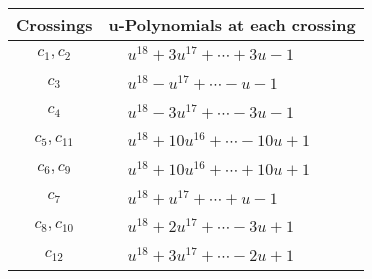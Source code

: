 \documentclass[1p]{elsarticle_modified}
\theoremstyle{definition}
\begin{document}
\begin{tabular}{m{50pt}|m{274pt}}
Crossings & \hspace{64pt}u-Polynomials at each crossing \\
\hline $$\begin{aligned}c_{1},c_{2}\end{aligned}$$&$\begin{aligned}
&u^{18}+3 u^{17}+\cdots+3 u-1
\end{aligned}$\\
\hline $$\begin{aligned}c_{3}\end{aligned}$$&$\begin{aligned}
&u^{18}- u^{17}+\cdots- u-1
\end{aligned}$\\
\hline $$\begin{aligned}c_{4}\end{aligned}$$&$\begin{aligned}
&u^{18}-3 u^{17}+\cdots-3 u-1
\end{aligned}$\\
\hline $$\begin{aligned}c_{5},c_{11}\end{aligned}$$&$\begin{aligned}
&u^{18}+10 u^{16}+\cdots-10 u+1
\end{aligned}$\\
\hline $$\begin{aligned}c_{6},c_{9}\end{aligned}$$&$\begin{aligned}
&u^{18}+10 u^{16}+\cdots+10 u+1
\end{aligned}$\\
\hline $$\begin{aligned}c_{7}\end{aligned}$$&$\begin{aligned}
&u^{18}+u^{17}+\cdots+u-1
\end{aligned}$\\
\hline $$\begin{aligned}c_{8},c_{10}\end{aligned}$$&$\begin{aligned}
&u^{18}+2 u^{17}+\cdots-3 u+1
\end{aligned}$\\
\hline $$\begin{aligned}c_{12}\end{aligned}$$&$\begin{aligned}
&u^{18}+3 u^{17}+\cdots-2 u+1
\end{aligned}$\\
\hline
\end{tabular}\\~\\
\end{document}

